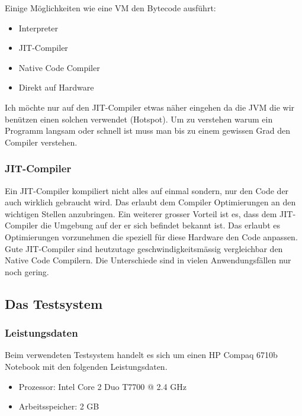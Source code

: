 \documentclass{fancydocument}
\begin{document}
Einige Möglichkeiten wie eine VM den Bytecode ausführt:


\begin{itemize}
\item Interpreter
\item JIT-Compiler
\item Native Code Compiler
\item Direkt auf Hardware
\end{itemize}

Ich m\"ochte nur auf den JIT-Compiler etwas n\"aher eingehen da die JVM
die wir ben\"utzen einen solchen verwendet (Hotspot). Um zu verstehen warum ein
Programm langsam oder schnell ist muss man bis zu einem gewissen Grad
den Compiler verstehen.

\subsubsection{JIT-Compiler}

Ein JIT-Compiler kompiliert nicht alles auf einmal sondern, nur den
Code der auch wirklich gebraucht wird. Das erlaubt dem Compiler
Optimierungen an den wichtigen Stellen anzubringen. Ein weiterer
grosser Vorteil ist es, dass dem JIT-Compiler die Umgebung auf der er
sich befindet bekannt ist. Das erlaubt es Optimierungen vorzunehmen
die speziell für diese Hardware den Code anpassen.
\\
Gute JIT-Compiler sind heutzutage geschwindigkeitsmässig vergleichbar den Native Code Compilern. Die Unterschiede sind in vielen
Anwendungsf\"allen nur noch gering.

\subsection{Das Testsystem}
\subsubsection{Leistungsdaten}
Beim verwendeten Testsystem  handelt es sich um einen HP Compaq 6710b Notebook mit den folgenden Leistungsdaten.

\begin{itemize}
\item Prozessor: Intel Core 2 Duo T7700 @ 2.4 GHz
\item Arbeitsspeicher: 2 GB
\end{itemize}
\end{document}
